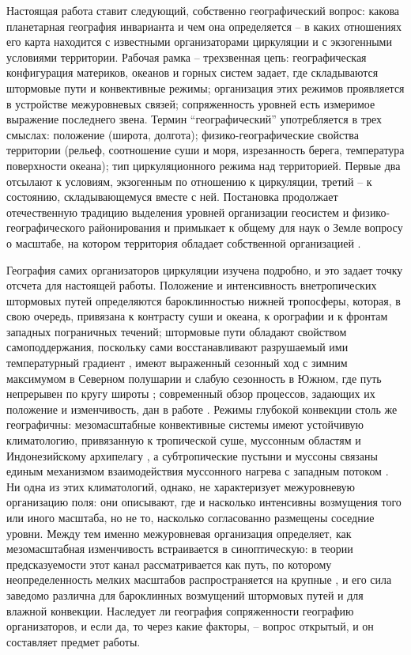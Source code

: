 \documentclass[12pt,a4paper]{article}
\begin{document}
Настоящая работа ставит следующий, собственно географический вопрос: какова планетарная география инварианта и чем она определяется -- в каких отношениях его карта находится с известными организаторами циркуляции и с экзогенными условиями территории. Рабочая рамка -- трехзвенная цепь: географическая конфигурация материков, океанов и горных систем задает, где складываются штормовые пути и конвективные режимы; организация этих режимов проявляется в устройстве межуровневых связей; сопряженность уровней есть измеримое выражение последнего звена. Термин “географический” употребляется в трех смыслах: положение (широта, долгота); физико-географические свойства территории (рельеф, соотношение суши и моря, изрезанность берега, температура поверхности океана); тип циркуляционного режима над территорией. Первые два отсылают к условиям, экзогенным по отношению к циркуляции, третий -- к состоянию, складывающемуся вместе с ней. Постановка продолжает отечественную традицию выделения уровней организации геосистем и физико-географического районирования \cite{Sochava1978,Isachenko1991,Bertrand1968} и примыкает к общему для наук о Земле вопросу о масштабе, на котором территория обладает собственной организацией \cite{Simon1962,Levin1992,WuLoucks1995}.

География самих организаторов циркуляции изучена подробно, и это задает точку отсчета для настоящей работы. Положение и интенсивность внетропических штормовых путей определяются бароклинностью нижней тропосферы, которая, в свою очередь, привязана к контрасту суши и океана, к орографии и к фронтам западных пограничных течений; штормовые пути обладают свойством самоподдержания, поскольку сами восстанавливают разрушаемый ими температурный градиент \cite{HoskinsValdes1990}, имеют выраженный сезонный ход с зимним максимумом в Северном полушарии \cite{Chang2002} и слабую сезонность в Южном, где путь непрерывен по кругу широты \cite{Trenberth1991}; современный обзор процессов, задающих их положение и изменчивость, дан в работе \cite{Shaw2016}. Режимы глубокой конвекции столь же географичны: мезомасштабные конвективные системы имеют устойчивую климатологию, привязанную к тропической суше, муссонным областям и Индонезийскому архипелагу \cite{Houze2004,NealeSlingo2003,Feng2021}, а субтропические пустыни и муссоны связаны единым механизмом взаимодействия муссонного нагрева с западным потоком \cite{RodwellHoskins1996}. Ни одна из этих климатологий, однако, не характеризует межуровневую организацию поля: они описывают, где и насколько интенсивны возмущения того или иного масштаба, но не то, насколько согласованно размещены соседние уровни. Между тем именно межуровневая организация определяет, как мезомасштабная изменчивость встраивается в синоптическую: в теории предсказуемости этот канал рассматривается как путь, по которому неопределенность мелких масштабов распространяется на крупные \cite{Zhang2007,RotunnoSnyder2008,Judt2020}, и его сила заведомо различна для бароклинных возмущений штормовых путей и для влажной конвекции. Наследует ли география сопряженности географию организаторов, и если да, то через какие факторы, -- вопрос открытый, и он составляет предмет работы.
\end{document}
